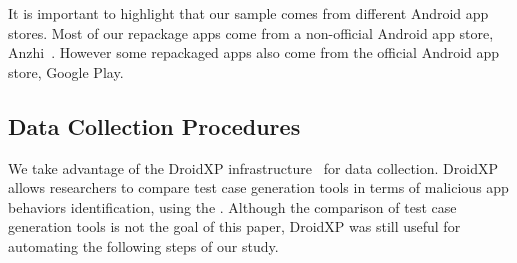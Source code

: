 




It is important to highlight that our sample comes
from different Android app stores. Most of our repackage apps come from a non-official
Android app store, Anzhi~\cite{anzhi}. However some repackaged apps also come from the
official Android app store, Google Play.




\subsection{Data Collection Procedures} \label{sec:dataCollectionProc}

We take advantage of the DroidXP infrastructure~\cite{DBLP:conf/scam/CostaMCMVBC20}
for data collection. DroidXP allows researchers to compare 
test case generation tools in terms of malicious app behaviors identification, using the \mas. Although the comparison of test
case generation tools is not the goal of this paper, DroidXP
was still useful for automating the following steps of our study.


